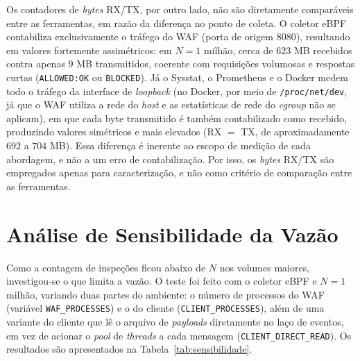 Os contadores de \textit{bytes} RX/TX, por outro lado, não são diretamente comparáveis entre as ferramentas, em razão da diferença no ponto de coleta. O coletor eBPF contabiliza exclusivamente o tráfego do WAF (porta de origem 8080), resultando em valores fortemente assimétricos: em $N = 1$ milhão, cerca de $623$ MB recebidos contra apenas $9$ MB transmitidos, coerente com requisições volumosas e respostas curtas (\texttt{ALLOWED:OK} ou \texttt{BLOCKED}). Já o Sysstat, o Prometheus e o Docker medem todo o tráfego da interface de \textit{loopback} (no Docker, por meio de \texttt{/proc/net/dev}, já que o WAF utiliza a rede do \textit{host} e as estatísticas de rede do \textit{cgroup} não se aplicam), em que cada byte transmitido é também contabilizado como recebido, produzindo valores simétricos e mais elevados (RX $=$ TX, de aproximadamente $692$ a $704$ MB). Essa diferença é inerente ao escopo de medição de cada abordagem, e não a um erro de contabilização. Por isso, os \textit{bytes} RX/TX são empregados apenas para caracterização, e não como critério de comparação entre as ferramentas.

\section{Análise de Sensibilidade da Vazão}
\label{sec:sensibilidade}

Como a contagem de inspeções ficou abaixo de $N$ nos volumes maiores, investigou-se o que limita a vazão. O teste foi feito com o coletor eBPF e $N = 1$ milhão, variando duas partes do ambiente: o número de processos do WAF (variável \texttt{WAF\_PROCESSES}) e o do cliente (\texttt{CLIENT\_PROCESSES}), além de uma variante do cliente que lê o arquivo de \textit{payloads} diretamente no laço de eventos, em vez de acionar o \textit{pool} de \textit{threads} a cada mensagem (\texttt{CLIENT\_DIRECT\_READ}). Os resultados são apresentados na Tabela~\ref{tab:sensibilidade}.

